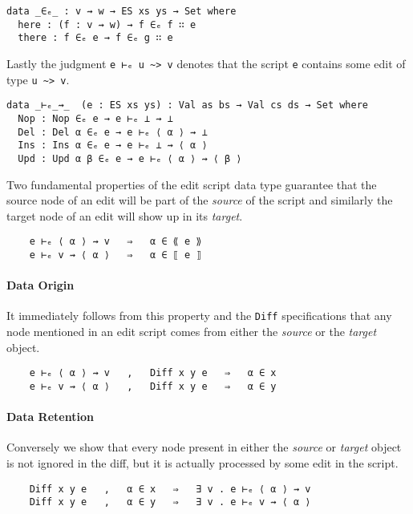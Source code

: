 \documentclass[preprint]{sigplanconf}
\begin{document}
\begin{verbatim}
data _∈ₑ_ : v ⇝ w → ES xs ys → Set where
  here : (f : v ⇝ w) → f ∈ₑ f ∷ e
  there : f ∈ₑ e → f ∈ₑ g ∷ e
\end{verbatim}
    Lastly the judgment \texttt{e ⊢ₑ u \textasciitilde> v} denotes that
    the script \texttt{e} contains some edit of type \texttt{u \textasciitilde> v}.
\begin{verbatim}
data _⊢ₑ_⇝_  (e : ES xs ys) : Val as bs → Val cs ds → Set where
  Nop : Nop ∈ₑ e → e ⊢ₑ ⊥ ⇝ ⊥
  Del : Del α ∈ₑ e → e ⊢ₑ ⟨ α ⟩ ⇝ ⊥
  Ins : Ins α ∈ₑ e → e ⊢ₑ ⊥ ⇝ ⟨ α ⟩
  Upd : Upd α β ∈ₑ e → e ⊢ₑ ⟨ α ⟩ ⇝ ⟨ β ⟩ 
\end{verbatim}
    Two fundamental properties of the edit script data type guarantee that
    the source node of an edit will be part of the \emph{source} of the script and
    similarly the target node of an edit will show up in its \emph{target}.
\begin{verbatim}
    e ⊢ₑ ⟨ α ⟩ ⇝ v   ⇒   α ∈ ⟪ e ⟫
    e ⊢ₑ v ⇝ ⟨ α ⟩   ⇒   α ∈ ⟦ e ⟧
\end{verbatim}

    \paragraph{Data Origin}

    It immediately follows from this property and the \texttt{Diff} specifications 
    that any node mentioned in an edit script comes from either the \emph{source}
    or the \emph{target} object.
\begin{verbatim}
    e ⊢ₑ ⟨ α ⟩ ⇝ v   ,   Diff x y e   ⇒   α ∈ x 
    e ⊢ₑ v ⇝ ⟨ α ⟩   ,   Diff x y e   ⇒   α ∈ y 
\end{verbatim}

    \paragraph{Data Retention}
    Conversely we show that every node present in either the \emph{source} or
    \emph{target} object is not ignored in the diff, but it is 
    actually processed by some edit in the script.

\begin{verbatim}
    Diff x y e   ,   α ∈ x   ⇒   ∃ v . e ⊢ₑ ⟨ α ⟩ ⇝ v
    Diff x y e   ,   α ∈ y   ⇒   ∃ v . e ⊢ₑ v ⇝ ⟨ α ⟩
\end{verbatim}
 
\end{document}
